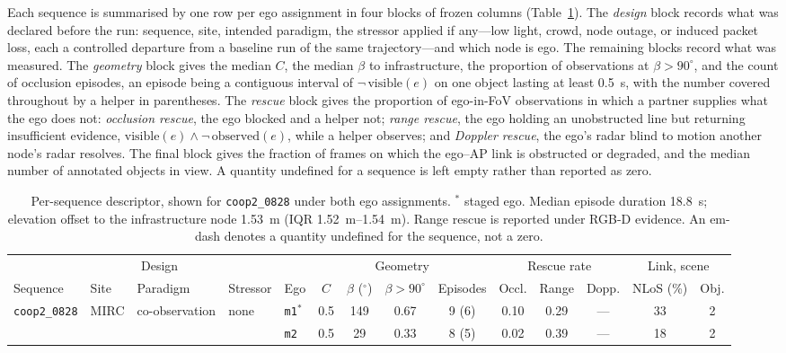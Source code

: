 Each sequence is summarised by one row per ego assignment in four blocks of
frozen columns (Table~\ref{tab:seq}). The \textit{design} block records what was
declared before the run: sequence, site, intended paradigm, the stressor applied
if any---low light, crowd, node outage, or induced packet loss, each a
controlled departure from a baseline run of the same trajectory---and which
node is ego. The remaining blocks record what was measured. The
\textit{geometry} block gives the median $C$, the median $\beta$ to
infrastructure, the proportion of observations at $\beta > 90^\circ$, and the
count of occlusion episodes, an episode being a contiguous interval of
$\neg\,\mathrm{visible}(e)$ on one object lasting at least \SI{0.5}{\second},
with the number covered throughout by a helper in parentheses. The
\textit{rescue} block gives the proportion of ego-in-FoV observations in which a
partner supplies what the ego does not: \textit{occlusion rescue}, the ego
blocked and a helper not; \textit{range rescue}, the ego holding an unobstructed
line but returning insufficient evidence,
$\mathrm{visible}(e) \wedge \neg\,\mathrm{observed}(e)$, while a helper
observes; and \textit{Doppler rescue}, the ego's radar blind to motion another
node's radar resolves. The final block gives the fraction of frames on which the
ego--AP link is obstructed or degraded, and the median number of annotated
objects in view. A quantity undefined for a sequence is left empty rather than
reported as zero.

\begin{table}[t]
\centering
\caption{Per-sequence descriptor, shown for \texttt{coop2\_0828} under both ego
assignments. $^\ast$ staged ego. Median episode duration \SI{18.8}{\second};
elevation offset to the infrastructure node \SI{1.53}{\metre} (IQR
\SIrange{1.52}{1.54}{\metre}). Range rescue is reported under RGB-D evidence.
An em-dash denotes a quantity undefined for the sequence, not a zero.}
\label{tab:seq}
\small
\setlength{\tabcolsep}{4pt}
\begin{tabular}{@{}lllllccccccccc@{}}
\toprule
\multicolumn{5}{c}{Design} & \multicolumn{4}{c}{Geometry} &
\multicolumn{3}{c}{Rescue rate} & \multicolumn{2}{c}{Link, scene} \\
\cmidrule(r){1-5}\cmidrule(lr){6-9}\cmidrule(lr){10-12}\cmidrule(l){13-14}
Sequence & Site & Paradigm & Stressor & Ego &
$C$ & $\beta$ ($^\circ$) & $\beta > 90^\circ$ & Episodes &
Occl. & Range & Dopp. &
NLoS (\%) & Obj. \\
\midrule
\multirow{2}{*}{\texttt{coop2\_0828}} & \multirow{2}{*}{MIRC} &
\multirow{2}{*}{co-observation} & \multirow{2}{*}{none} &
\texttt{m1}$^\ast$ & 0.5 & 149 & 0.67 & 9 (6) & 0.10 & 0.29 & --- & 33 & 2 \\
 & & & & \texttt{m2} & 0.5 & 29 & 0.33 & 8 (5) & 0.02 & 0.39 & --- & 18 & 2 \\
\bottomrule
\end{tabular}
\end{table}

